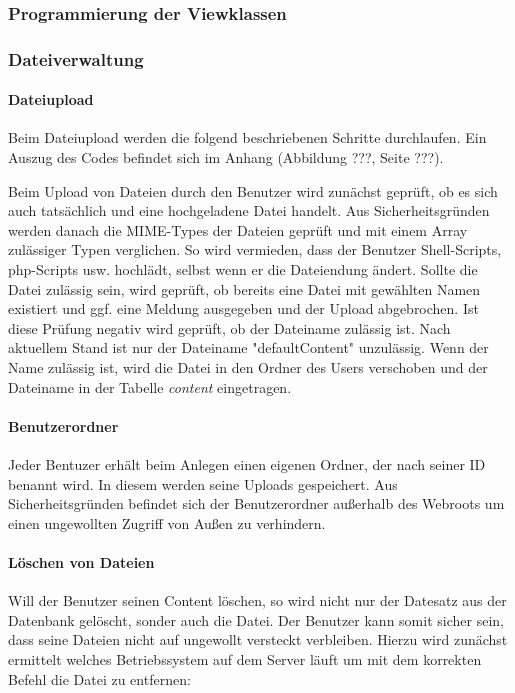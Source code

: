 \documentclass[10pt]{scrarticle}
\begin{document}
\subsubsection{Programmierung der Viewklassen}
\subsubsection{Dateiverwaltung}



\paragraph{Dateiupload}

Beim Dateiupload werden die folgend beschriebenen Schritte durchlaufen. Ein Auszug des Codes befindet sich im Anhang (Abbildung ???, Seite ???).

Beim Upload von Dateien durch den Benutzer wird zunächst geprüft, ob es sich auch tatsächlich und eine hochgeladene Datei handelt. Aus Sicherheitsgründen werden danach die MIME-Types der Dateien geprüft und mit einem Array zulässiger Typen verglichen. So wird vermieden, dass der Benutzer Shell-Scripts, php-Scripts usw. hochlädt, selbst wenn er die Dateiendung ändert. Sollte die Datei zulässig sein, wird geprüft, ob bereits eine Datei mit gewählten Namen existiert und ggf. eine Meldung ausgegeben und der Upload abgebrochen. Ist diese Prüfung negativ wird geprüft, ob der Dateiname zulässig ist. Nach aktuellem Stand ist nur der Dateiname "defaultContent" unzulässig. Wenn der Name zulässig ist, wird die Datei in den Ordner des Users verschoben und der Dateiname in der Tabelle \textit{content} eingetragen.

\paragraph{Benutzerordner}

Jeder Bentuzer erhält beim Anlegen einen eigenen Ordner, der nach seiner ID benannt wird. In diesem werden seine Uploads gespeichert. Aus Sicherheitsgründen befindet sich der Benutzerordner außerhalb des Webroots um einen ungewollten Zugriff von Außen zu verhindern.

\paragraph{Löschen von Dateien}
Will der Benutzer seinen Content löschen, so wird nicht nur der Datesatz aus der Datenbank gelöscht, sonder auch die Datei. Der Benutzer kann somit sicher sein, dass seine Dateien nicht auf ungewollt versteckt verbleiben. Hierzu wird zunächst ermittelt welches Betriebssystem auf dem Server läuft um mit dem korrekten Befehl die Datei zu entfernen:
\end{document}
